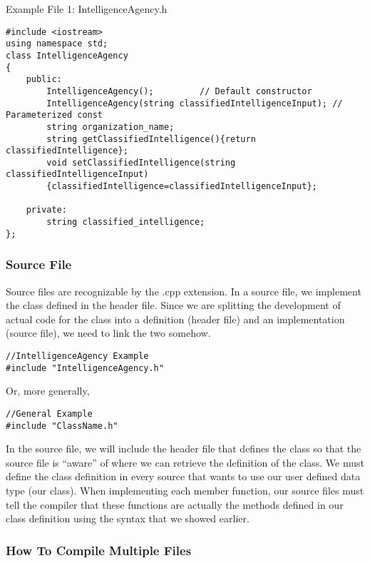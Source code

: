 \begin{example}
    Example File 1: IntelligenceAgency.h
    \begin{verbatim}
#include <iostream> 
using namespace std; 
class IntelligenceAgency
{
    public:
        IntelligenceAgency();         // Default constructor
        IntelligenceAgency(string classifiedIntelligenceInput); // Parameterized const
        string organization_name;
        string getClassifiedIntelligence(){return classifiedIntelligence};
        void setClassifiedIntelligence(string classifiedIntelligenceInput)
        {classifiedIntelligence=classifiedIntelligenceInput};

    private:
        string classified_intelligence;
};
    \end{verbatim}
\end{example}

\subsubsection{Source File}

Source files are recognizable by the .cpp extension. In a source file, we implement the class defined in the header file. Since we are splitting the development of actual code for the class into a definition (header file) and an implementation (source file), we need to link the two somehow.

\begin{verbatim}
//IntelligenceAgency Example
#include "IntelligenceAgency.h"
\end{verbatim}

Or, more generally,

\begin{verbatim}
//General Example
#include "ClassName.h"
\end{verbatim}

In the source file, we will include the header file that defines the class so that the source file is “aware” of where we can retrieve the definition of the class. We must define the class definition in every source that wants to use our user defined data type (our class). When implementing each member function, our source files must tell the compiler that these functions are actually the methods defined in our class definition using the syntax that we showed earlier.

\subsubsection{How To Compile Multiple Files}


